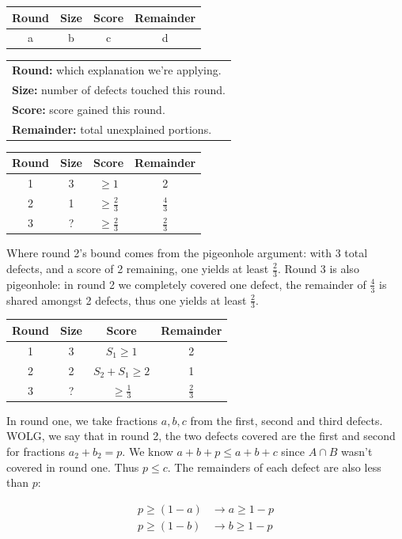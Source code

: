 \documentclass[11pt,twocolumn]{article}
\begin{document}
\begin{tabular}{cccc}\hline
Round & Size & Score & Remainder \\ \hline
a & b & c & d \\
\end{tabular}

\begin{tabular}{l}
{\bf Round:} which explanation we're applying. \\
{\bf Size:} number of defects touched this round.  \\
{\bf Score:} score gained this round.  \\
{\bf Remainder:} total unexplained portions. \\
\end{tabular}

\begin{tabular}{cccc}\hline
Round & Size & Score & Remainder \\ \hline
1 & 3 & $\geq 1$ & 2 \\
2 & 1 & $\geq \frac23$ & $\frac43$ \\
3 & ? & $\geq \frac23$ & $\frac23$ \\
\end{tabular}

Where round 2's bound comes from the pigeonhole argument: with 3 total defects, and a score of 2 remaining, one yields at least $\frac23$.  Round 3 is also pigeonhole: in round 2 we completely covered one defect, the remainder of $\frac43$ is shared amongst 2 defects, thus one yields at least $\frac23$.

\begin{tabular}{cccc}\hline
Round & Size & Score & Remainder \\ \hline
1 & 3 & $S_1 \geq 1$ & 2 \\
2 & 2 & $S_2 + S_1 \geq 2$ & 1 \\
3 & ? & $\geq \frac13$ & $\frac23$ \\
\end{tabular}

In round one, we take fractions ${a,b,c}$ from the first, second and third defects.  WOLG, we say that in round 2, the two defects covered are the first and second for fractions $a_2 + b_2 = p$.  We know $a + b + p \leq a + b + c$ since $A \cap B$ wasn't covered in round one.  Thus $p \leq c$.  The remainders of each defect are also less than $p$: 

\begin{eqnarray*}
p \geq (1-a) & \rightarrow a \geq 1-p \\
p \geq (1-b) &\rightarrow b \geq 1-p \\
\end{eqnarray*}
\end{document}
